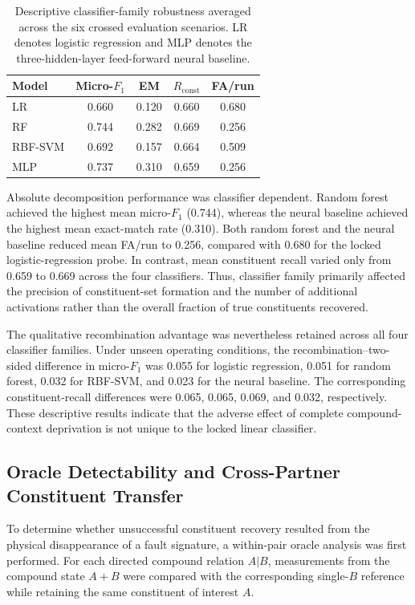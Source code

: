 \begin{table}[!t]
\caption{Descriptive classifier-family robustness averaged across the six
crossed evaluation scenarios. LR denotes logistic regression and MLP
denotes the three-hidden-layer feed-forward neural baseline.}
\label{tab:families}
\centering
\begin{tabular}{l c c c c}
\toprule
Model & Micro-$F_1$ & EM & $R_{\mathrm{const}}$ & FA/run \\
\midrule
LR      & 0.660 & 0.120 & 0.660 & 0.680 \\
RF      & 0.744 & 0.282 & 0.669 & 0.256 \\
RBF-SVM & 0.692 & 0.157 & 0.664 & 0.509 \\
MLP     & 0.737 & 0.310 & 0.659 & 0.256 \\
\bottomrule
\end{tabular}
\end{table}

Absolute decomposition performance was classifier dependent. Random forest
achieved the highest mean micro-$F_1$ (0.744), whereas the neural baseline
achieved the highest mean exact-match rate (0.310). Both random forest and
the neural baseline reduced mean FA/run to 0.256, compared with 0.680 for
the locked logistic-regression probe. In contrast, mean constituent recall
varied only from 0.659 to 0.669 across the four classifiers. Thus,
classifier family primarily affected the precision of constituent-set
formation and the number of additional activations rather than the overall
fraction of true constituents recovered.

The qualitative recombination advantage was nevertheless retained across
all four classifier families. Under unseen operating conditions, the
recombination--two-sided difference in micro-$F_1$ was 0.055 for logistic
regression, 0.051 for random forest, 0.032 for RBF-SVM, and 0.023 for the
neural baseline. The corresponding constituent-recall differences were
0.065, 0.065, 0.069, and 0.032, respectively. These descriptive results
indicate that the adverse effect of complete compound-context deprivation
is not unique to the locked linear classifier.

\subsection{Oracle Detectability and Cross-Partner Constituent Transfer}
\label{sec:oracleresults}

To determine whether unsuccessful constituent recovery resulted from the
physical disappearance of a fault signature, a within-pair oracle analysis
was first performed. For each directed compound relation $A|B$,
measurements from the compound state $A{+}B$ were compared with the
corresponding single-$B$ reference while retaining the same constituent of
interest $A$.

